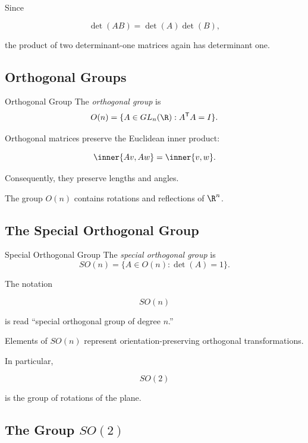 Since

\[ \det(AB)=\det(A)\det(B), \]

the product of two determinant-one matrices again has determinant one.

\subsection{Orthogonal Groups}
\label{subsec:orthogonal-groups}

\begin{definitionbox}{Orthogonal Group}
The \emph{orthogonal group} is
\[ O(n)=\{A\in GL_n(\R):A^{\mathsf T}A=I\}. \]
\end{definitionbox}

Orthogonal matrices preserve the Euclidean inner product:

\[ \inner{Av,Aw}=\inner{v,w}. \]

Consequently, they preserve lengths and angles.

The group \(O(n)\) contains rotations and reflections of \(\R^n\).

\subsection{The Special Orthogonal Group}
\label{subsec:special-orthogonal-group}

\begin{definitionbox}{Special Orthogonal Group}
The \emph{special orthogonal group} is
\[ SO(n)=\{A\in O(n):\det(A)=1\}. \]
\end{definitionbox}

The notation

\[ SO(n) \]

is read ``special orthogonal group of degree \(n\).''

Elements of \(SO(n)\) represent orientation-preserving orthogonal
transformations.

In particular,

\[ SO(2) \]

is the group of rotations of the plane.

\subsection{The Group \(SO(2)\)}
\label{subsec:so2}

